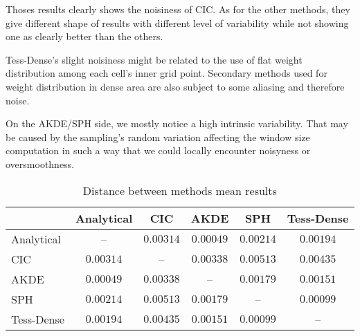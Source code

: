 \documentclass[10pt,a4paper,twoside,twocolumn]{article}
\newcommand*{\rootPath}{../}
\begin{document}
Thoses results clearly shows the noisiness of CIC. As for the other methods,
they give different shape of results with different level of variability while
not showing one as clearly better than the others.

Tess-Dense's slight noisiness might be related to the use of flat weight
distribution among each cell's inner grid point. Secondary methods used for
weight distribution in dense area are also subject to some aliasing and
therefore noise.

On the AKDE/SPH side, we mostly notice a high intrinsic variability. That may be
caused by the sampling's random variation affecting the window size computation
in such a way that we could locally encounter noisyness or oversmoothness.

\begin{table*}[!ht]
	\centering
	\begin{tabular}{|l|c|c|c|c|c|}
		\hline
								& Analytical	& CIC				& AKDE			& SPH				& Tess-Dense\\
		\hline
		Analytical	& --					& $0.00314$	& $0.00049$	& $0.00214$	& $0.00194$	\\
		CIC					&	$0.00314$		& --				& $0.00338$	& $0.00513$	& $0.00435$	\\
		AKDE				&	$0.00049$		&	$0.00338$	& --				& $0.00179$	& $0.00151$	\\
		SPH					&	$0.00214$		&	$0.00513$	& $0.00179$	& --				& $0.00099$	\\
		Tess-Dense	&	$0.00194$		&	$0.00435$	& $0.00151$	& $0.00099$	& --				\\
		\hline
	\end{tabular}
	\caption{Distance between methods mean results}
\end{table*}

\ifstandalone
	
	
\fi
\end{document}
